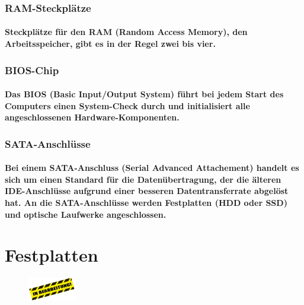 \documentclass[a4paper]{article}
\begin{document}
    \subsubsection{\color{codegreen}RAM-Steckplätze}
    \paragraph{\color{codegreen}Steckplätze für den RAM (Random Access Memory), den Arbeitsspeicher, gibt es in der Regel zwei bis vier.}
    \subsubsection{\color{codegreen}BIOS-Chip}
    \paragraph{\color{codegreen}Das BIOS (Basic Input/Output System) führt bei jedem Start des Computers einen System-Check durch und initialisiert alle angeschlossenen Hardware-Komponenten.}
    \subsubsection{\color{codegreen}SATA-Anschlüsse}
    \paragraph{\color{codegreen}Bei einem SATA-Anschluss (Serial Advanced Attachement) handelt es sich um einen Standard für die Datenübertragung, der die älteren IDE-Anschlüsse aufgrund einer besseren Datentransferrate abgelöst hat. An die SATA-Anschlüsse werden Festplatten (HDD oder SSD) und optische Laufwerke angeschlossen.}

    \section{Festplatten}\label{sec:festplatten}

    \begin{center}
        \begin{figure}[H]
            \centering
            \includegraphics[height=1cm]{media/s_111}\label{fig:bearb4}
        \end{figure}
    \end{center}
    
\end{document}
